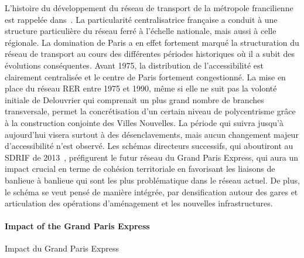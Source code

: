 L'histoire du développement du réseau de transport de la métropole francilienne est rappelée dans~\cite{beauguitte:halshs-01068589}. La particularité centralisatrice française a conduit à une structure particulière du réseau ferré à l'échelle nationale, mais aussi à celle régionale. La domination de Paris a en effet fortement marqué la structuration du réseau de transport au cours des différentes périodes historiques où il a subit des évolutions conséquentes. Avant 1975, la distribution de l'accessibilité est clairement centralisée et le centre de Paris fortement congestionné. La mise en place du réseau RER entre 1975 et 1990, même si elle ne suit pas la volonté initiale de Delouvrier qui comprenait un plus grand nombre de branches transversale, permet la concrétisation d'un certain niveau de polycentrisme grâce à la construction conjointe des Villes Nouvelles. La période qui suivra jusqu'à aujourd'hui visera surtout à des désenclavements, mais aucun changement majeur d'accessibilité n'est observé. Les schémas directeurs successifs, qui aboutiront au SDRIF de 2013~\cite{sdrif2013}, préfigurent le futur réseau du Grand Paris Express, qui aura un impact crucial en terme de cohésion territoriale en favorisant les liaisons de banlieue à banlieue qui sont les plus problématique dans le réseau actuel. De plus, le schéma se veut pensé de manière intégrée, par densification autour des gares et articulation des opérations d'aménagement et les nouvelles infrastructures.




\paragraph{Impact of the Grand Paris Express}{Impact du Grand Paris Express}


